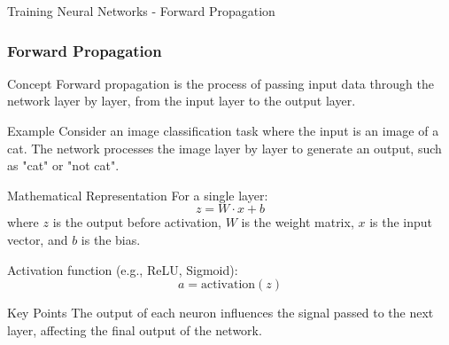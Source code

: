 \documentclass[aspectratio=169]{beamer}
\begin{document}
\begin{frame}[fragile]{Training Neural Networks - Forward Propagation}
    \frametitle{Forward Propagation}
    \begin{block}{Concept}
        Forward propagation is the process of passing input data through the network layer by layer, from the input layer to the output layer.
    \end{block}
    
    \begin{block}{Example}
        Consider an image classification task where the input is an image of a cat. The network processes the image layer by layer to generate an output, such as "cat" or "not cat".
    \end{block}
    
    \begin{block}{Mathematical Representation}
        For a single layer:
        \begin{equation}
            z = W \cdot x + b
        \end{equation}
        where $z$ is the output before activation, $W$ is the weight matrix, $x$ is the input vector, and $b$ is the bias.
        
        Activation function (e.g., ReLU, Sigmoid):
        \begin{equation}
            a = \text{activation}(z)
        \end{equation}
    \end{block}

    \begin{block}{Key Points}
        The output of each neuron influences the signal passed to the next layer, affecting the final output of the network.
    \end{block}
\end{frame}
\end{document}
